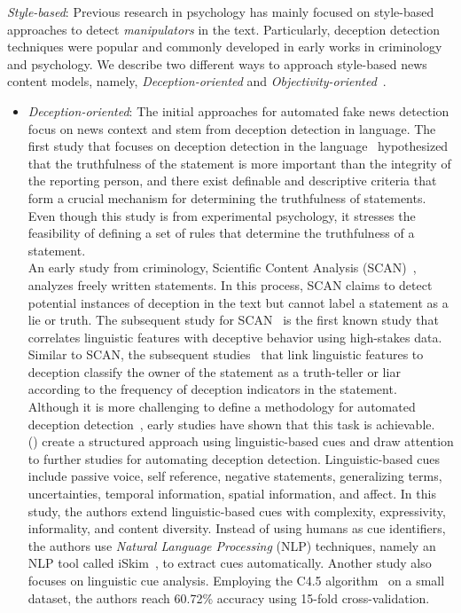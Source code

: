 \begin{description}
    \item{\emph{Style-based}:} Previous research in psychology has mainly focused on style-based approaches to detect \emph{manipulators} in the text. Particularly, deception detection techniques were popular and commonly developed in early works in criminology and psychology. We describe two different ways to approach style-based news content models, namely, \emph{Deception-oriented} and \emph{Objectivity-oriented}~\parencite{FakeNewsDetectionOnSocialMediaADataMiningPerspective_Shu}.
    \begin{itemize}
        \item \emph{Deception-oriented}: The initial approaches for automated fake news detection focus on news context and stem from deception detection in language. The first study that focuses on deception detection in the language~\parencite{DieEntwicklungDerGerichtspsychologischen_Undeutsch} hypothesized that the truthfulness of the statement is more important than the integrity of the reporting person, and there exist definable and descriptive criteria that form a crucial mechanism for determining the truthfulness of statements. Even though this study is from experimental psychology, it stresses the feasibility of defining a set of rules that determine the truthfulness of a statement.\\
              An early study from criminology, Scientific Content Analysis (SCAN)~\parencite{SCAN_Sapir1987}, analyzes freely written statements.  In this process, SCAN claims to detect potential instances of deception in the text but cannot label a statement as a lie or truth. The subsequent study for SCAN~\parencite{SCAN_Smith2001} is the first known study that correlates linguistic features with deceptive behavior using high-stakes data. Similar to SCAN, the subsequent studies~\parencite{CommunicationUnderStress_Adams, LyingWords_Newman} that link linguistic features to deception classify the owner of the statement as a truth-teller or liar according to the frequency of deception indicators in the statement.\\
              Although it is more challenging to define a methodology for automated deception detection~\parencite{TheAccuracyConfidenceRelation_DePaulo}, early studies have shown that this task is achievable.~\citeauthor{AutomatingLinguisticsBasedCues_Zhou} (\citeyear{AutomatingLinguisticsBasedCues_Zhou}) create a structured approach using linguistic-based cues and draw attention to further studies for automating deception detection. Linguistic-based cues include passive voice, self reference, negative statements, generalizing terms, uncertainties, temporal information, spatial information, and affect. In this study, the authors extend linguistic-based cues with complexity, expressivity, informality, and content diversity. Instead of using humans as cue identifiers, the authors use \emph{Natural Language Processing} (NLP) techniques, namely an NLP tool called iSkim~\parencite{iSkim_Zhou}, to extract cues automatically. Another study also focuses on linguistic cue analysis. Employing the C4.5 algorithm~\parencite{C45_Salzberg} on a small dataset, the authors reach 60.72\% accuracy using 15-fold cross-validation.\\

\end{itemize}
\end{description}
